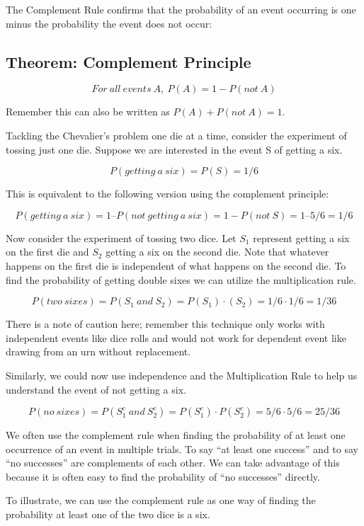 \documentclass[]{book}
\theoremstyle{definition}
\theoremstyle{definition}
\theoremstyle{definition}
\theoremstyle{remark}
\begin{document}
The Complement Rule confirms that the probability of an event occurring
is one minus the probability the event does not occur:

\subsection{Theorem: Complement
Principle}\label{theorem-complement-principle}

\[For \ all \ events \ A, \ P(A)= 1-P(not \ A)\]

Remember this can also be written as \(P(A) + P(not \ A) = 1\).

Tackling the Chevalier's problem one die at a time, consider the
experiment of tossing just one die. Suppose we are interested in the
event S of getting a six.

\[P(getting \ a \ six) = P(S) = 1/6\]

This is equivalent to the following version using the complement
principle:

\[P(getting \ a \ six) = 1 – P(not \ getting \ a \ six) = 1 - P(not \ S) = 1 – 5/6 = 1/6\]

Now consider the experiment of tossing two dice. Let \(S_{1}\) represent
getting a six on the first die and \(S_{2}\) getting a six on the second
die. Note that whatever happens on the first die is independent of what
happens on the second die. To find the probability of getting double
sixes we can utilize the multiplication rule.

\[P(two \ sixes)= P(S_{1} \ and \ S_{2})=P(S_{1}) \cdot (S_{2})=  1/6 \cdot 1/6=1/36\]

There is a note of caution here; remember this technique only works with
independent events like dice rolls and would not work for dependent
event like drawing from an urn without replacement.

Similarly, we could now use independence and the Multiplication Rule to
help us understand the event of not getting a six.

\[P(no \ sixes)= P(S_{1}^{c} \ and \ S_{2}^{c}) = P(S_{1}^{c}) \cdot P(S_{2}^{c}) =5/6 \cdot 5/6=25/36\]

We often use the complement rule when finding the probability of at
least one occurrence of an event in multiple trials. To say ``at least
one success'' and to say ``no successes'' are complements of each other.
We can take advantage of this because it is often easy to find the
probability of ``no successes'' directly.

To illustrate, we can use the complement rule as one way of finding the
probability at least one of the two dice is a six.
\end{document}
